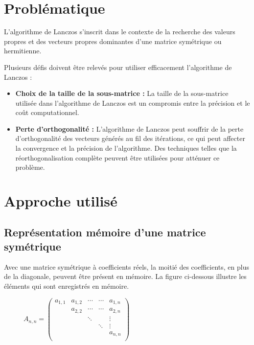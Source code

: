 \documentclass[11pt,french]{article}
\begin{document}
	\section{Problématique}
	\par L'algorithme de Lanczos s'inscrit dans le contexte de la recherche des valeurs propres et des vecteurs propres dominantes d'une matrice symétrique ou hermitienne.
 
    Plusieurs défis doivent être relevés pour utiliser efficacement l'algorithme de Lanczos :
    \begin{itemize}
    \item \textbf{Choix de la taille de la sous-matrice :} La taille de la sous-matrice utilisée dans l'algorithme de Lanczos est un compromis entre la précision et le coût computationnel.

     \item \textbf{Perte d'orthogonalité :} L'algorithme de Lanczos peut souffrir de la perte d'orthogonalité des vecteurs générés au fil des itérations, ce qui peut affecter la convergence et la précision de l'algorithme. Des techniques telles que la réorthogonalisation complète peuvent être utilisées pour atténuer ce problème.
    
    \end{itemize}
	\section{Approche utilisé}
	
	\subsection{Représentation mémoire d'une matrice symétrique}
	Avec une matrice symétrique à coefficients réels, la moitié des coefficients, en plus de la diagonale, peuvent être présent en mémoire. La figure ci-dessous illustre les éléments qui sont enregistrés en mémoire.
		\begin{figure}[h]
		\centering
		$A _{n, n}=
		\begin{pmatrix}
			a_{1,1} & a_{1,2}& \cdots & \cdots & a_{1,n} \\  
			   & a_{2,2} & \cdots & \cdots & a_{2,n} \\  
			   &   & \ddots &   & \vdots \\  
			   &   &   & \ddots & \vdots \\  
			   &   &   &   & a_{n,n}\\  
		\end{pmatrix}
		$
	\end{figure}
	 \newpage 
\end{document}
